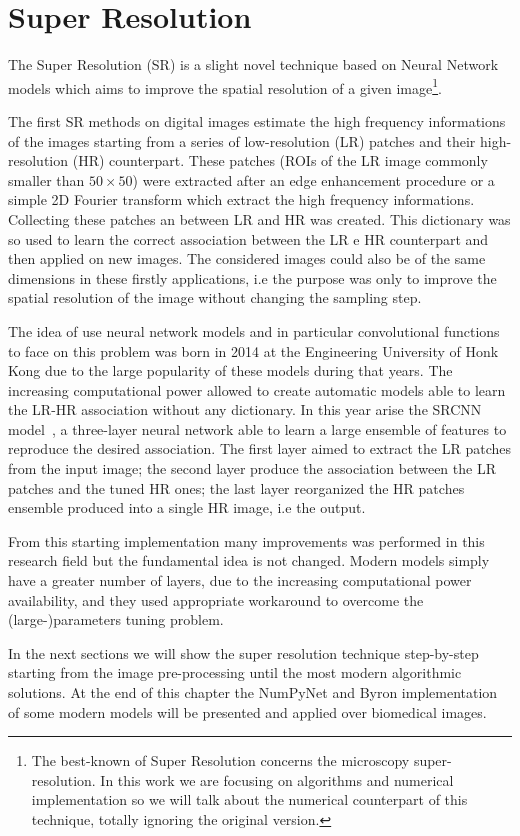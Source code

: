 \documentclass{standalone}
\begin{document}
\section[Super Resolution]{Super Resolution}\label{SR:sr}

The Super Resolution (SR) is a slight novel technique based on Neural Network models which aims to improve the spatial resolution of a given image\footnote{
  The best-known  of Super Resolution concerns the microscopy super-resolution.
  In this work we are focusing on algorithms and numerical implementation so we will talk about the numerical counterpart of this technique, totally ignoring the original  version.
}.

The first SR methods on digital images estimate the high frequency informations of the images starting from a series of low-resolution (LR) patches and their high-resolution (HR) counterpart.
These patches (ROIs of the LR image commonly smaller than $50\times50$) were extracted after an edge enhancement procedure or a simple 2D Fourier transform which extract the high frequency informations.
Collecting these patches an  between LR and HR was created.
This dictionary was so used to learn the correct association between the LR e HR counterpart and then applied on new images.
The considered images could also be of the same dimensions in these firstly applications, i.e the purpose was only to improve the spatial resolution of the image without changing the sampling step.

The idea of use neural network models and in particular convolutional functions to face on this problem was born in 2014 at the Engineering University of Honk Kong due to the large popularity of these models during that years.
The increasing computational power allowed to create automatic models able to learn the LR-HR association without any dictionary.
In this year arise the SRCNN model~\cite{SRCNN}, a three-layer neural network able to learn a large ensemble of features to reproduce the desired association.
The first layer aimed to extract the LR patches from the input image; the second layer produce the association between the LR patches and the tuned HR ones; the last layer reorganized the HR patches ensemble produced into a single HR image, i.e the output.

From this starting implementation many improvements was performed in this research field but the fundamental idea is not changed.
Modern models simply have a greater number of layers, due to the increasing computational power availability, and they used appropriate workaround to overcome the (large-)parameters tuning problem.

In the next sections we will show the super resolution technique step-by-step starting from the image pre-processing until the most modern algorithmic solutions.
At the end of this chapter the NumPyNet and Byron implementation of some modern models will be presented and applied over biomedical images.

\end{document}
